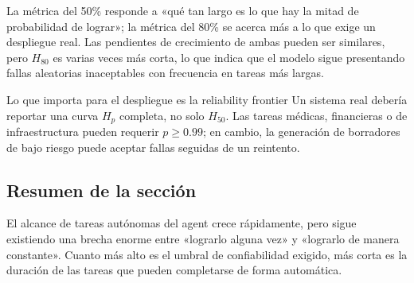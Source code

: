 
La métrica del 50\% responde a «qué tan largo es lo que hay la mitad de probabilidad de lograr»; la métrica del 80\% se acerca más a lo que exige un despliegue real. Las pendientes de crecimiento de ambas pueden ser similares, pero $H_{80}$ es varias veces más corta, lo que indica que el modelo sigue presentando fallas aleatorias inaceptables con frecuencia en tareas más largas.

\begin{importantbox}{Lo que importa para el despliegue es la reliability frontier}
Un sistema real debería reportar una curva $H_p$ completa, no solo $H_{50}$. Las tareas médicas, financieras o de infraestructura pueden requerir $p\ge 0.99$; en cambio, la generación de borradores de bajo riesgo puede aceptar fallas seguidas de un reintento.
\end{importantbox}

\subsection{Resumen de la sección}

El alcance de tareas autónomas del agent crece rápidamente, pero sigue existiendo una brecha enorme entre «lograrlo alguna vez» y «lograrlo de manera constante». Cuanto más alto es el umbral de confiabilidad exigido, más corta es la duración de las tareas que pueden completarse de forma automática.

